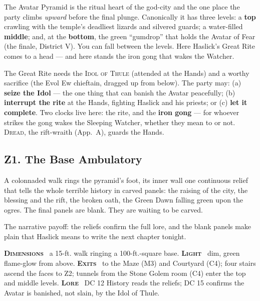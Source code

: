\documentclass[10pt,twoside]{article}
\newcommand{\tech}[1]{\textbf{\scshape\textcolor{stone}{#1}}\ }
\newcommand{\eqname}[1]{\textsc{#1}}
\begin{document}
The Avatar Pyramid is the ritual heart of the god-city and the one place the party
climbs \emph{upward} before the final plunge. Canonically it has three levels: a
\textbf{top} crawling with the temple's deadliest lizards and silvered guards; a
water-filled \textbf{middle}; and, at the \textbf{bottom}, the green ``gumdrop'' that
holds the Avatar of Fear (the finale, District V). You can fall between the levels.
Here Haslick's Great Rite comes to a head --- and here stands the iron gong that wakes
the Watcher.

\begin{dmnote}
The Great Rite needs the \eqname{Idol of Thule} (attended at the Hands) and a worthy
sacrifice (the Evol Ew chieftain, dragged up from below). The party may: (a)
\textbf{seize the Idol} --- the one thing that can banish the Avatar peacefully; (b)
\textbf{interrupt the rite} at the Hands, fighting Haslick and his priests; or (c)
\textbf{let it complete}. Two clocks live here: the rite, and the \textbf{iron gong}
--- for whoever strikes the gong wakes the Sleeping Watcher, whether they mean to or
not. \eqname{Dread}, the rift-wraith (App.\ A), guards the Hands.
\end{dmnote}

\subsection{Z1. The Base Ambulatory}
\begin{readaloud}
A colonnaded walk rings the pyramid's foot, its inner wall one continuous relief that
tells the whole terrible history in carved panels: the raising of the city, the
blessing and the rift, the broken oath, the Green Dawn falling green upon the ogres.
The final panels are blank. They are waiting to be carved.
\end{readaloud}
The narrative payoff: the reliefs confirm the full lore, and the blank panels make
plain that Haslick means to write the next chapter tonight.

\begin{techbox}
\tech{Dimensions} a 15-ft. walk ringing a 100-ft.-square base. \tech{Light} dim,
green flame-glow from above. \tech{Exits} to the Maze (M3) and Courtyard (C4); four
stairs ascend the faces to Z2; tunnels from the Stone Golem room (C4) enter the top
and middle levels. \tech{Lore} DC 12 History reads the reliefs; DC 15 confirms the
Avatar is banished, not slain, by the Idol of Thule.
\end{techbox}
\end{document}
